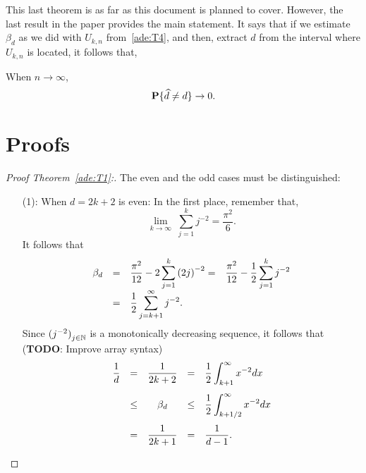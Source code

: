 \vspace*{0.5 em}

This last theorem is as far as this document is planned to cover. However, the last result in the paper provides the main statement. It says that if we estimate $\beta_d$ as we did with $U_{k,n}$ from~\ref{ade:T4}, and then, extract $\widehat{d}$ from the interval where $U_{k,n}$ is located, it follows that,
\begin{theorem}[Consistency]\label{ade:T5}
  When $n\to \infty$,
  \[ \P\{\widehat{d} \neq d\} \to 0.\]
\end{theorem}

\section{Proofs}

\begin{proof}[Proof Theorem~\ref{ade:T1}:]\label{ade:T1P}
  The even and the odd cases must be distinguished:
  \begin{enumerate}
    \item[(1):] When $d = 2k+2$ is even:
    In the first place, remember that,
    \[ \lim_{k\to\infty}\; \sum_{j = 1}^{k} j^{-2} = \frac{\pi^2}{6}.\] 
    It follows that
    \[\everymath{\displaystyle}
      \begin{array}{rrlll}
        \beta_d & = & \frac{\pi^2}{12} - 2 \sum_{j = 1}^{k} {(2j)}^{-2}= & \frac{\pi^2}{12} - \frac{1}{2} \sum_{j = 1}^{k} j^{-2}\\
        & = & \frac{1}{2} \sum_{j = k+1}^{\infty} j^{-2}.
      \end{array}      
     \]
    Since ${(j^{-2})}_{j \in \N}$ is a monotonically decreasing sequence, it follows that (\textbf{TODO}: Improve array syntax)
    \[\everymath{\displaystyle} 
      \begin{array}{rrcll}
        \frac{1}{d}   & = & \frac{1}{2k+2}  & = & \frac{1}{2} \int_{k+1}^{\infty}x^{-2} dx\\[5mm]
      & \leq & \beta_d  & \leq & \frac{1}{2} \int_{k+1/2}^{\infty}x^{-2} dx\\[5mm]
      & = & \frac{1}{2k+1} & = & \frac{1}{d-1}.
    \end{array}  \] 


\end{enumerate}
\end{proof}
